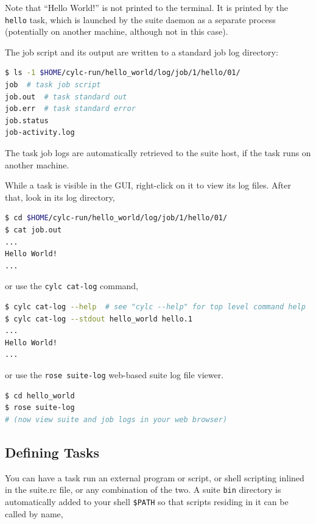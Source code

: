 Note that ``Hello World!'' is not printed to the terminal. It is printed by 
the \lstinline=hello= task, which is launched by the suite daemon as a separate
process (potentially on another machine, although not in this case).


The job script and its output are written to a standard job log directory:

\begin{lstlisting}[language=bash]
$ ls -1 $HOME/cylc-run/hello_world/log/job/1/hello/01/
job  # task job script
job.out  # task standard out
job.err  # task standard error
job.status
job-activity.log
\end{lstlisting}

The task job logs are automatically retrieved to the suite host, if the task
runs on another machine.

While a task is visible in the GUI, right-click on it to view its log files.
After that, look in its log directory,

\begin{lstlisting}[language=bash]
$ cd $HOME/cylc-run/hello_world/log/job/1/hello/01/
$ cat job.out
...
Hello World!
...
\end{lstlisting}

or use the \lstinline{cylc cat-log} command,

\begin{lstlisting}[language=bash]
$ cylc cat-log --help  # see "cylc --help" for top level command help
$ cylc cat-log --stdout hello_world hello.1
...
Hello World!
...
\end{lstlisting}

or use the \lstinline{rose suite-log} web-based suite log file viewer.

\begin{lstlisting}[language=bash]
$ cd hello_world
$ rose suite-log
# (now view suite and job logs in your web browser)
\end{lstlisting}

\subsection{Defining Tasks}

You can have a task run an external program or script, or shell scripting
inlined in the suite.rc file, or any combination of the two.  A suite
\lstinline{bin} directory is automatically added to your shell
\lstinline{$PATH} so that scripts residing in it can be called by name,

